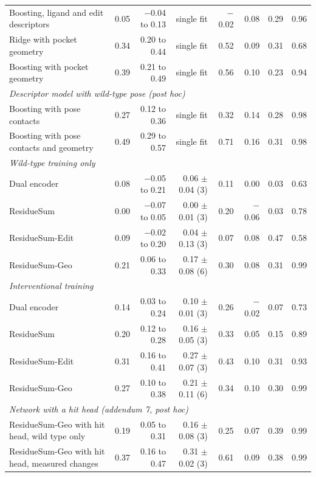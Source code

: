\begin{table}[t]
{\begin{tabular}{lrrrrrrr}
\quad Boosting, ligand and edit descriptors & 0.05 & $-$0.04 to 0.13 & single fit & $-$0.02 & 0.08 & 0.29 & 0.96 \\
\quad Ridge with pocket geometry & 0.34 & 0.20 to 0.44 & single fit & 0.52 & 0.09 & 0.31 & 0.68 \\
\quad Boosting with pocket geometry & 0.39 & 0.21 to 0.49 & single fit & 0.56 & 0.10 & 0.23 & 0.94 \\
\midrule
\multicolumn{8}{l}{\emph{Descriptor model with wild-type pose (post hoc)}} \\
\quad Boosting with pose contacts & 0.27 & 0.12 to 0.36 & single fit & 0.32 & 0.14 & 0.28 & 0.98 \\
\quad Boosting with pose contacts and geometry & 0.49 & 0.29 to 0.57 & single fit & 0.71 & 0.16 & 0.31 & 0.98 \\
\midrule
\multicolumn{8}{l}{\emph{Wild-type training only}} \\
\quad Dual encoder & 0.08 & $-$0.05 to 0.21 & 0.06 $\pm$ 0.04 (3) & 0.11 & 0.00 & 0.03 & 0.63 \\
\quad ResidueSum & 0.00 & $-$0.07 to 0.05 & 0.00 $\pm$ 0.01 (3) & 0.20 & $-$0.06 & 0.03 & 0.78 \\
\quad ResidueSum-Edit & 0.09 & $-$0.02 to 0.20 & 0.04 $\pm$ 0.13 (3) & 0.07 & 0.08 & 0.47 & 0.58 \\
\quad ResidueSum-Geo & 0.21 & 0.06 to 0.33 & 0.17 $\pm$ 0.08 (6) & 0.30 & 0.08 & 0.31 & 0.99 \\
\midrule
\multicolumn{8}{l}{\emph{Interventional training}} \\
\quad Dual encoder & 0.14 & 0.03 to 0.24 & 0.10 $\pm$ 0.01 (3) & 0.26 & $-$0.02 & 0.07 & 0.73 \\
\quad ResidueSum & 0.20 & 0.12 to 0.28 & 0.16 $\pm$ 0.05 (3) & 0.33 & 0.05 & 0.15 & 0.89 \\
\quad ResidueSum-Edit & 0.31 & 0.16 to 0.41 & 0.27 $\pm$ 0.07 (3) & 0.43 & 0.10 & 0.31 & 0.93 \\
\quad ResidueSum-Geo & 0.27 & 0.10 to 0.38 & 0.21 $\pm$ 0.11 (6) & 0.34 & 0.10 & 0.30 & 0.99 \\
\midrule
\multicolumn{8}{l}{\emph{Network with a hit head (addendum 7, post hoc)}} \\
\quad ResidueSum-Geo with hit head, wild type only & 0.19 & 0.05 to 0.31 & 0.16 $\pm$ 0.08 (3) & 0.25 & 0.07 & 0.39 & 0.99 \\
\quad ResidueSum-Geo with hit head, measured changes & 0.37 & 0.16 to 0.47 & 0.31 $\pm$ 0.02 (3) & 0.61 & 0.09 & 0.38 & 0.99 \\

\end{tabular}}
\end{table}
